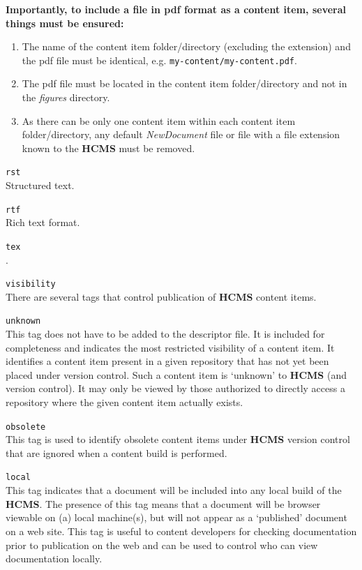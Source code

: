 \documentclass[12pt]{article}
\begin{document}
\begin{description}
\begin{description}
	{\bf Importantly, to include a file in pdf format as a content item, several things must be ensured:}
		\begin{enumerate}
		\item The name of the content item folder/directory (excluding the extension) and the pdf file must be identical, e.g. {\tt \small my-content/my-content.pdf}.
		\item The pdf file must be located in the content item folder/directory and not in the {\it figures} directory.
		\item As there can be only one content item within each content item folder/directory, any default {\it NewDocument} file or file with a file extension known to the {\bf \small HCMS} must be removed.
		\end{enumerate}
	\item {\tt rst}\\
 	Structured text.
	\item {\tt rtf}\\
	Rich text format.
	\item {\tt tex}\\
 	\LaTeXe.
	\end{description}
\item{\tt visibility}\\
There are several tags that control publication of {\bf \small HCMS} content items.
	\begin{description}
		\item {\tt unknown}\\
		This tag does not have to be added to the descriptor file. It is included for completeness and indicates the most restricted visibility of a content item. It  identifies a content item present in a given repository that has not yet been placed under version control. Such a content item is `unknown' to {\bf \small HCMS} (and version control). It may only be viewed by those authorized to directly access a repository where the given content item actually exists.
		\item {\tt obsolete}\\
		This tag is used to identify obsolete content items under {\bf \small HCMS} version control that are ignored when a content build is performed.
		\item {\tt local}\\
		This tag indicates that a document will be included into any local build of the {\bf \small HCMS}. The presence of this tag means that a document will be browser viewable on (a) local machine(s), but will not appear as a `published' document on a web site. This tag is useful to content developers for checking documentation prior to publication on the web and can be used to control who can view documentation locally.

\end{description}
\end{description}
\end{document}
